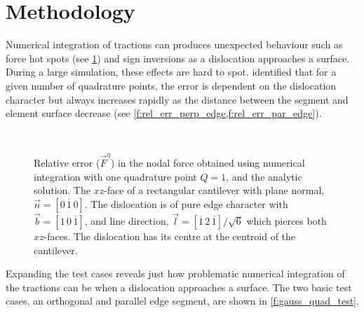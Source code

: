 \documentclass[11pt]{iopart}
\begin{document}
\section{Methodology}\label{s:method}
Numerical integration of tractions can produces unexpected behaviour such as force hot spots (see \cref{f:err_basic_cantilever}) and sign inversions as a dislocation approaches a surface. During a large simulation, these effects are hard to spot. \citet{Queyreau} identified that for a given number of quadrature points, the error is dependent on the dislocation character but always increases rapidly as the distance between the segment and element surface decrease (see \cref{f:rel_err_perp_edge,f:rel_err_par_edge}).
%
\begin{figure}[htb]
    \centering
    ~
    \caption{Relative error ($\vec{F}^{\eta}$) in the nodal force obtained using numerical integration with one quadrature point $Q = 1$, and the analytic solution. The $xz$-face of a rectangular cantilever with plane normal, $\vec{n} = \left[0\,\overline{1}\,0\right]$. The dislocation is of pure edge character with $\vec{b} = [1\,0\,\overline{1}]$, and line direction, $\vec{l} = \left[\overline{1}\,2\,\overline{1}\right]/\sqrt{6}$ which pierces both $xz$-faces. The dislocation has its centre at the centroid of the cantilever. %
    }
    \label{f:err_basic_cantilever}
\end{figure}
%
Expanding the test cases reveals just how problematic numerical integration of the tractions can be when a dislocation approaches a surface. The two basic test cases, an orthogonal and parallel edge segment, are shown in \cref{f:gauss_quad_test}.
\end{document}

